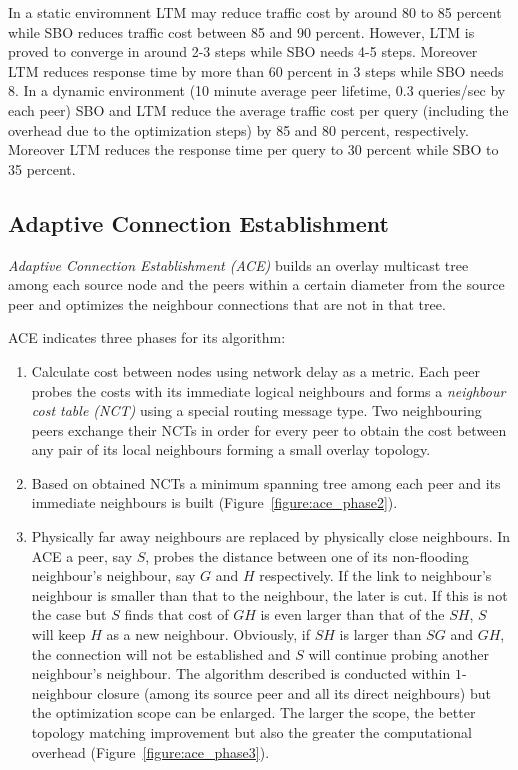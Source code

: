\documentclass[a4paper,10pt]{article}
\begin{document}
In a static enviromnent LTM may reduce traffic cost by around 80 to 85 percent while SBO reduces traffic cost between 85 and 90 percent. However, LTM  is proved to converge in around 2-3 steps while SBO needs 4-5 steps. Moreover LTM reduces response time by more than 60 percent in 3 steps while SBO needs 8. In a dynamic environment (10 minute average peer lifetime, 0.3 queries/sec by each peer) SBO and LTM reduce the average traffic cost per query (including the overhead due to the optimization steps) by 85 and 80 percent, respectively. Moreover LTM reduces the response time per query to 30 percent while SBO to 35 percent.

\subsection{Adaptive Connection Establishment}
\emph{Adaptive Connection Establishment (ACE)} \cite{liu_ace_2004} builds an overlay multicast tree among each source node and the peers within a certain diameter from the source peer and optimizes the neighbour connections that are not in that tree.

ACE indicates three phases for its algorithm:
\begin{enumerate}
  \item Calculate cost between nodes using network delay as a metric. Each peer probes the costs with its immediate logical neighbours and forms a \emph{neighbour cost table (NCT)} using a special routing message type. Two neighbouring peers exchange their NCTs in order for every peer to obtain the cost between any pair of its local neighbours forming a small overlay topology.
  \item Based on obtained NCTs a minimum spanning tree among each peer and its immediate neighbours is built (Figure~\ref{figure:ace_phase2}).
  \item Physically far away neighbours are replaced by physically close neighbours. In ACE a peer, say $S$, probes the distance between one of its non-flooding neighbour's neighbour, say $G$ and $H$ respectively. If the link to neighbour's neighbour is smaller than that to the neighbour, the later is cut. If this is not the case but $S$ finds that cost of $GH$ is even larger than that of the $SH$, $S$ will keep $H$ as a new neighbour. Obviously, if $SH$ is larger than $SG$ and $GH$, the connection will not be established and $S$ will continue probing another neighbour's neighbour. The algorithm described is conducted within $1$-neighbour closure (among its source peer and all its direct neighbours) but the optimization scope can be enlarged. The larger the scope, the better topology matching improvement but also the greater the computational overhead (Figure~\ref{figure:ace_phase3}).
\end{enumerate}
\end{document}
